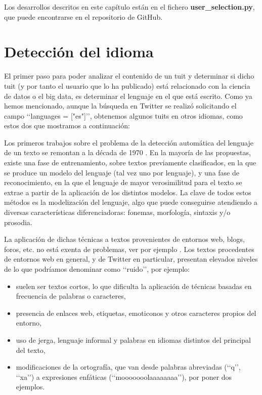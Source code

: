 Los desarrollos descritos en este capítulo están en el fichero {\bf user\_selection.py}, 
que puede encontrarse en el repositorio de GitHub.


\section{Detección del idioma} 
\label{sect:deteccion_idioma}

El primer paso para poder analizar el contenido de un tuit y determinar si dicho tuit 
(y por tanto el usuario que lo ha publicado) está relacionado con la ciencia de datos o el big data,
es determinar el lenguaje en el que está escrito. Como ya hemos mencionado,
aunque la búsqueda en Twitter se realizó solicitando el campo \lq\lq languages = ["es"]\rq\rq,
obtenemos algunos tuits en otros idiomas, como estos dos 
que mostramos a continuación:


Los primeros trabajos sobre el problema de la detección automática del lenguaje de un texto
se remontan a la década de 1970 \cite{zissman-berkling}. En la mayoría de las propuestas, 
existe una fase de entrenamiento, sobre textos previamente clasificados, en la que se produce 
un modelo del lenguaje (tal vez uno por lenguaje), y una fase de reconocimiento, en la que 
el lenguaje de mayor verosimilitud para el texto se extrae a partir de la aplicación de los 
distintos modelos. La clave de todos estos métodos es la modelización del lenguaje, algo que puede 
conseguirse atendiendo a diversas características diferenciadoras: fonemas, morfología, 
sintaxis y/o prosodia. 

La aplicación de dichas técnicas a textos provenientes de entornos web, blogs,  foros, etc. 
no está exenta de problemas, ver por ejemplo \cite{almeida_estevez_piad}.
Los textos procedentes de entornos web en general, y de Twitter en particular, 
presentan elevados niveles de lo que podríamos denominar como \lq\lq ruido\rq\rq,
por ejemplo:
\begin{itemize}
\item suelen ser textos cortos, lo que dificulta la aplicación de técnicas basadas en frecuencia 
de palabras o caracteres,
\item presencia de enlaces web, etiquetas, emoticonos y otros caracteres propios del entorno,
\item uso de jerga, lenguaje informal y palabras en idiomas distintos del principal del texto,
\item modificaciones de la ortografía, que van desde palabras abreviadas (\lq\lq q\rq\rq, 
\lq\lq xa\rq\rq) a expresiones enfáticas (\lq\lq mooooooolaaaaaaaa\rq\rq), por poner dos 
ejemplos.
\end{itemize}


